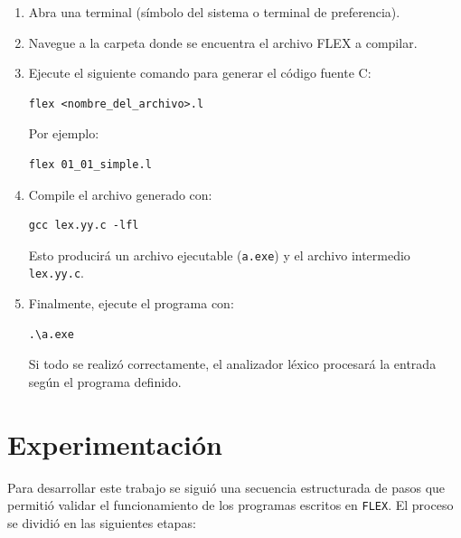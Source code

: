 \documentclass{article}
\begin{document}
\begin{enumerate}
    \item Abra una terminal (símbolo del sistema o terminal de preferencia).
    \item Navegue a la carpeta donde se encuentra el archivo FLEX a compilar.
    \item Ejecute el siguiente comando para generar el código fuente C:
    \begin{verbatim}
flex <nombre_del_archivo>.l
    \end{verbatim}
    Por ejemplo:
    \begin{verbatim}
flex 01_01_simple.l
    \end{verbatim}

    \item Compile el archivo generado con:
    \begin{verbatim}
gcc lex.yy.c -lfl
    \end{verbatim}

    Esto producirá un archivo ejecutable (\texttt{a.exe}) y el archivo intermedio \texttt{lex.yy.c}.

    \item Finalmente, ejecute el programa con:
    \begin{verbatim}
.\a.exe
    \end{verbatim}

    Si todo se realizó correctamente, el analizador léxico procesará la entrada según el programa definido.
\end{enumerate}




\section{Experimentación}\label{sec:exp}

Para desarrollar este trabajo se siguió una secuencia estructurada de pasos que permitió validar el funcionamiento de los programas escritos en \texttt{FLEX}. El proceso se dividió en las siguientes etapas:
\end{document}
